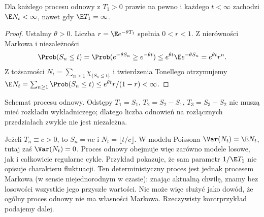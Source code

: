 \begin{stwierdzenie}
Dla każdego procesu odnowy z $T_1>0$ prawie na pewno i każdego
$t<\infty$ zachodzi $\E N_t<\infty$, nawet gdy $\E T_1=\infty$.
\end{stwierdzenie}
\begin{proof}
Ustalmy $\theta>0$. Liczba
$r=\E e^{-\theta T_1}$ spełnia $0<r<1$.
Z nierówności Markowa i niezależności
\[
\Prob(S_n\le t)=\Prob(e^{-\theta S_n}\ge e^{-\theta t})
\le e^{\theta t}\E e^{-\theta S_n}=e^{\theta t}r^n.
\]
Z tożsamości $N_t=\sum_{n\ge1}\chi_{\{S_n\le t\}}$
i twierdzenia Tonellego otrzymujemy
$\E N_t=\sum_{n\ge1}\Prob(S_n\le t)
\le e^{\theta t}r/(1-r)<\infty$.
\end{proof}

\begin{center}
\par\smallskip\small Schemat procesu odnowy. Odstępy
$T_1=S_1$, $T_2=S_2-S_1$, $T_3=S_3-S_2$ nie muszą mieć rozkładu
wykładniczego; dlatego liczba odnowień na rozłącznych przedziałach
zwykle nie jest niezależna.
\end{center}

\begin{przyklad}
Jeżeli $T_n\equiv c>0$, to $S_n=nc$ i
$N_t=\lfloor t/c\rfloor$. W modelu Poissona
$\Var(N_t)=\E N_t$, tutaj zaś $\Var(N_t)=0$.
Proces odnowy obejmuje więc zarówno modele losowe, jak i
całkowicie regularne cykle. Przykład pokazuje, że sam parametr
$1/\E T_1$ nie opisuje charakteru fluktuacji.
Ten deterministyczny proces jest jednak procesem Markowa
(w sensie niejednorodnym w czasie): znając aktualną chwilę,
znamy bez losowości wszystkie jego przyszłe wartości.
Nie może więc służyć jako dowód, że ogólny proces odnowy
nie ma własności Markowa. Rzeczywisty kontrprzykład podajemy dalej.
\end{przyklad}


